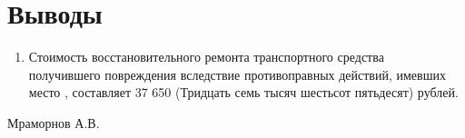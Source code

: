\section{Выводы}
%
%
\begin{enumerate}
\item  Стоимость восстановительного ремонта  транспортного средства \tc\,\- \, получившего повреждения вследствие противоправных действий, имевших место \- , составляет 37 650 (Тридцать семь тысяч шестьсот пятьдесят) рублей.\\[-2mm]   
\end{enumerate}
\vspace{10mm}
      \hfill                        {Мраморнов А.В.}
\vspace{7mm}
\relax

